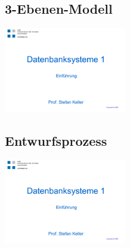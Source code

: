     \begin{multicols}{2}            
        \subsection{3-Ebenen-Modell}
            \includegraphics[page=22,trim=20 40 20 100,clip=true,width=0.4\textwidth]{images/einfuehrung.pdf}
        \subsection{Entwurfsprozess}
            \includegraphics[page=26,trim=20 20 20 85,clip=true,width=0.4\textwidth]{images/einfuehrung.pdf}
    \end{multicols}        